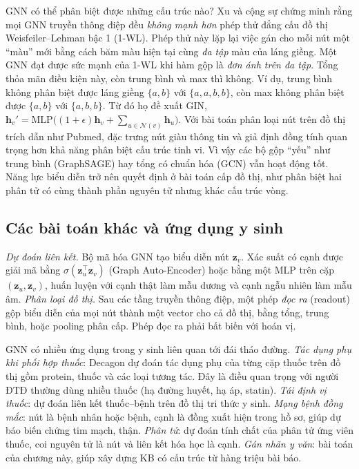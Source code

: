 GNN có thể phân biệt được những cấu trúc nào? Xu và cộng sự \cite{xu2019gin} chứng minh rằng mọi GNN truyền thông điệp đều \emph{không mạnh hơn} phép thử đẳng cấu đồ thị Weisfeiler–Lehman bậc 1 (1-WL). Phép thử này lặp lại việc gán cho mỗi nút một ``màu'' mới bằng cách băm màu hiện tại cùng \emph{đa tập} màu của láng giềng. Một GNN đạt được sức mạnh của 1-WL khi hàm gộp là \emph{đơn ánh trên đa tập}. Tổng thỏa mãn điều kiện này, còn trung bình và max thì không. Ví dụ, trung bình không phân biệt được láng giềng $\{a, b\}$ với $\{a, a, b, b\}$, còn max không phân biệt được $\{a, b\}$ với $\{a, b, b\}$. Từ đó họ đề xuất GIN, $\mathbf h_v' = \mathrm{MLP}\big((1+\epsilon)\mathbf h_v + \sum_{u\in\mathcal N(v)}\mathbf h_u\big)$. Với bài toán phân loại nút trên đồ thị trích dẫn như Pubmed, đặc trưng nút giàu thông tin và giả định đồng tính quan trọng hơn khả năng phân biệt cấu trúc tinh vi. Vì vậy các bộ gộp ``yếu'' như trung bình (GraphSAGE) hay tổng có chuẩn hóa (GCN) vẫn hoạt động tốt. Năng lực biểu diễn trở nên quyết định ở bài toán cấp đồ thị, như phân biệt hai phân tử có cùng thành phần nguyên tử nhưng khác cấu trúc vòng.

\subsection{Các bài toán khác và ứng dụng y sinh}

\emph{Dự đoán liên kết.} Bộ mã hóa GNN tạo biểu diễn nút $\mathbf z_v$. Xác suất có cạnh được giải mã bằng $\sigma(\mathbf z_u^\top\mathbf z_v)$ (Graph Auto-Encoder) hoặc bằng một MLP trên cặp $(\mathbf z_u,\mathbf z_v)$, huấn luyện với cạnh thật làm mẫu dương và cạnh ngẫu nhiên làm mẫu âm. \emph{Phân loại đồ thị.} Sau các tầng truyền thông điệp, một phép \emph{đọc ra} (readout) gộp biểu diễn của mọi nút thành một vector cho cả đồ thị, bằng tổng, trung bình, hoặc pooling phân cấp. Phép đọc ra phải bất biến với hoán vị.

GNN có nhiều ứng dụng trong y sinh liên quan tới đái tháo đường. \emph{Tác dụng phụ khi phối hợp thuốc}: Decagon \cite{zitnik2018} dự đoán tác dụng phụ của từng cặp thuốc trên đồ thị gồm protein, thuốc và các loại tương tác. Đây là điều quan trọng với người ĐTĐ thường dùng nhiều thuốc (hạ đường huyết, hạ áp, statin). \emph{Tái định vị thuốc}: dự đoán liên kết thuốc–bệnh trên đồ thị tri thức y sinh. \emph{Mạng bệnh đồng mắc}: nút là bệnh nhân hoặc bệnh, cạnh là đồng xuất hiện trong hồ sơ, giúp dự báo biến chứng tim mạch, thận. \emph{Phân tử}: dự đoán tính chất của phân tử ứng viên thuốc, coi nguyên tử là nút và liên kết hóa học là cạnh. \emph{Gán nhãn y văn}: bài toán của chương này, giúp xây dựng KB có cấu trúc từ hàng triệu bài báo.

